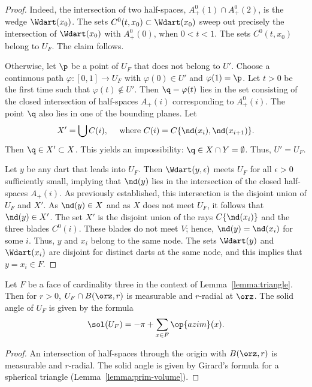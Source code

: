 \begin{proof} 
Indeed, the intersection of two half-spaces, $A^0_+(1)\cap
  A^0_+(2)$, is the wedge $\Wdart(x_0)$.  The sets
  $C^0(t,x_0)\subset\Wdart(x_0)$ sweep out precisely the intersection
  of $\Wdart(x_0)$ with $A^0_+(0)$, when $0<t<1$.  The sets
  $C^0(t,x_0)$ belong to $U_F$.  The claim follows.

   Otherwise, let
  $\p$ be a point of $U_F$ that does not belong to $U'$.  Choose a
  continuous path $\varphi:[0,1]\to U_F$ with $\varphi(0)\in U'$ and
  $\varphi(1)=\p$.  Let $t>0$ be the first time such that
  $\varphi(t)\not\in U'$.  Then $\q=\varphi(t)$ lies in the set
  consisting of the closed intersection of half-spaces $A_+(i)$
  corresponding to $A^0_+(i)$.  The point $\q$ also lies in one of the
  bounding planes.  Let
\[ 
X' = \bigcup C(i),\quad\text{ where } C(i)=C\{\nd(x_i),\nd(x_{i+1})\}.
\] 
Then $\q\in X'\subset X$.  This yields an impossibility:
$\q\in X\cap Y = \emptyset$.   Thus, $U'=U_F$.

Let $y$ be any dart that leads into $U_F$.  Then
$\Wdart(y,\epsilon)$ meets $U_F$ for all $\epsilon>0$ sufficiently
small, implying that $\nd(y)$ lies in the intersection of the
closed half-spaces $A_+(i)$.  As previously established, this
intersection is the disjoint union of $U_F$ and $X'$.  As $\nd(y)\in
X$ and as $X$ does not meet $U_F$, it follows that $\nd(y)\in X'$.  The set
$X'$ is the disjoint union of the rays $C\{\nd(x_i)\}$ and the three
blades $C^0(i)$.  These blades do not meet $V$; hence, $\nd(y)=\nd(x_i)$
for some $i$.  Thus, $y$ and $x_i$ belong to the same node.  The sets
$\Wdart(y)$ and $\Wdart( x_i)$ are disjoint for distinct darts at the
same node, and this implies that $y=x_i\in F$.
\end{proof}

\begin{corollary}\label{lemma:girard-component}
Let $F$ be a face of cardinality three in the context of
Lemma~\ref{lemma:triangle}.  Then for $r>0$, $U_F \cap B(\orz,r)$ is
measurable and $r$-radial at $\orz$.  The solid angle of $U_F$ is
given by the formula
\[ 
\sol(U_F) = -\pi + \sum_{x\in F}\op{azim}(x).
\] 
\end{corollary}
%
%
%

\begin{proof} An intersection of half-spaces through the origin 
with $B(\orz,r)$ is measurable and
$r$-radial.  The solid angle is given by Girard's formula for
a spherical triangle (Lemma~\ref{lemma:prim-volume}).
\end{proof}
%

